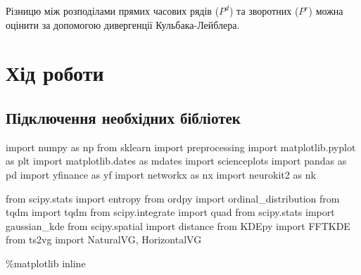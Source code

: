 \documentclass[
  letterpaper,
]{report}
\newenvironment{Shaded}{\begin{snugshade}}{\end{snugshade}}
\newcommand{\ImportTok}[1]{\textcolor[rgb]{0.00,0.46,0.62}{#1}}
\newcommand{\NormalTok}[1]{\textcolor[rgb]{0.00,0.23,0.31}{#1}}
\newcommand{\OperatorTok}[1]{\textcolor[rgb]{0.37,0.37,0.37}{#1}}
\begin{document}
Різницю між розподілами прямих часових рядів (\(P^{d}\)) та зворотних
(\(P^{r}\)) можна оцінити за допомогою дивергенції Кульбака-Лейблера.

\hypertarget{ux445ux456ux434-ux440ux43eux431ux43eux442ux438-6}{%
\section{Хід
роботи}\label{ux445ux456ux434-ux440ux43eux431ux43eux442ux438-6}}

\hypertarget{ux43fux456ux434ux43aux43bux44eux447ux435ux43dux43dux44f-ux43dux435ux43eux431ux445ux456ux434ux43dux438ux445-ux431ux456ux431ux43bux456ux43eux442ux435ux43a}{%
\subsection{Підключення необхідних
бібліотек}\label{ux43fux456ux434ux43aux43bux44eux447ux435ux43dux43dux44f-ux43dux435ux43eux431ux445ux456ux434ux43dux438ux445-ux431ux456ux431ux43bux456ux43eux442ux435ux43a}}

\begin{Shaded}
\begin{Highlighting}[]
\ImportTok{import}\NormalTok{ numpy }\ImportTok{as}\NormalTok{ np}
\ImportTok{from}\NormalTok{ sklearn }\ImportTok{import}\NormalTok{ preprocessing}
\ImportTok{import}\NormalTok{ matplotlib.pyplot }\ImportTok{as}\NormalTok{ plt}
\ImportTok{import}\NormalTok{ matplotlib.dates }\ImportTok{as}\NormalTok{ mdates}
\ImportTok{import}\NormalTok{ scienceplots}
\ImportTok{import}\NormalTok{ pandas }\ImportTok{as}\NormalTok{ pd}
\ImportTok{import}\NormalTok{ yfinance }\ImportTok{as}\NormalTok{ yf}
\ImportTok{import}\NormalTok{ networkx }\ImportTok{as}\NormalTok{ nx}
\ImportTok{import}\NormalTok{ neurokit2 }\ImportTok{as}\NormalTok{ nk}

\ImportTok{from}\NormalTok{ scipy.stats }\ImportTok{import}\NormalTok{ entropy}
\ImportTok{from}\NormalTok{ ordpy }\ImportTok{import}\NormalTok{ ordinal\_distribution}
\ImportTok{from}\NormalTok{ tqdm }\ImportTok{import}\NormalTok{ tqdm}
\ImportTok{from}\NormalTok{ scipy.integrate }\ImportTok{import}\NormalTok{ quad}
\ImportTok{from}\NormalTok{ scipy.stats }\ImportTok{import}\NormalTok{ gaussian\_kde}
\ImportTok{from}\NormalTok{ scipy.spatial }\ImportTok{import}\NormalTok{ distance}
\ImportTok{from}\NormalTok{ KDEpy }\ImportTok{import}\NormalTok{ FFTKDE}
\ImportTok{from}\NormalTok{ ts2vg }\ImportTok{import}\NormalTok{ NaturalVG, HorizontalVG}

\OperatorTok{\%}\NormalTok{matplotlib inline}
\end{Highlighting}
\end{Shaded}
\end{document}
